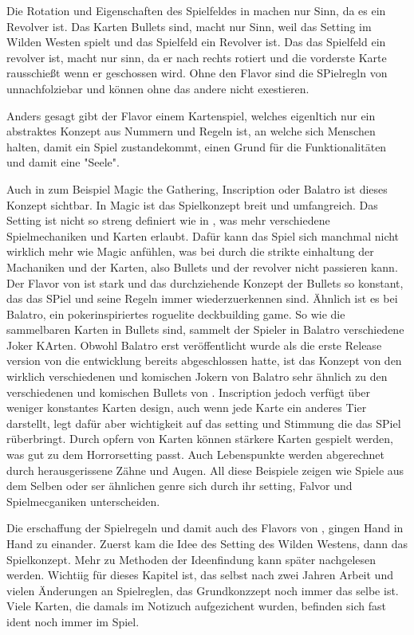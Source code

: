 Die Rotation und Eigenschaften des Spielfeldes in \FF machen nur Sinn, da es ein Revolver ist.
Das Karten Bullets sind, macht nur Sinn, weil das Setting im Wilden Westen spielt und das Spielfeld ein Revolver ist.
Das das Spielfeld ein revolver ist, macht nur sinn, da er nach rechts rotiert und die vorderste Karte rausschießt wenn er geschossen wird.
Ohne den Flavor sind die SPielregln von \FF unnachfolziebar und können ohne das andere nicht exestieren.


Anders gesagt gibt der Flavor einem Kartenspiel, welches eigenltich nur ein abstraktes Konzept aus Nummern und Regeln ist,
an welche sich Menschen halten, damit ein Spiel zustandekommt, einen Grund für die Funktionalitäten und damit eine "Seele".


Auch in zum Beispiel Magic the Gathering, Inscription oder Balatro ist dieses Konzept sichtbar. In Magic ist das Spielkonzept breit und umfangreich.
Das Setting ist nicht so streng definiert wie in \FF, was mehr verschiedene Spielmechaniken und Karten erlaubt.
Dafür kann das Spiel sich manchmal nicht wirklich mehr wie Magic anfühlen,
was bei \FF durch die strikte einhaltung der Machaniken und der Karten, also  Bullets und der revolver nicht passieren kann.
Der Flavor von \FF ist stark und das durchziehende Konzept der Bullets so konstant, das das SPiel und seine Regeln immer
wiederzuerkennen sind. Ähnlich ist es bei Balatro, ein pokerinspiriertes roguelite deckbuilding game.
So wie die sammelbaren Karten in \FF Bullets sind, sammelt der Spieler in Balatro verschiedene Joker KArten.
Obwohl Balatro erst veröffentlicht wurde als die erste Release version von \FF die entwicklung bereits abgeschlossen hatte,
ist das Konzept von den wirklich verschiedenen und komischen Jokern von Balatro sehr ähnlich zu den verschiedenen und
komischen Bullets von \FF.
Inscription jedoch verfügt über weniger konstantes Karten design, auch wenn jede Karte ein anderes Tier darstellt,
legt dafür aber wichtigkeit auf das setting und Stimmung die das SPiel rüberbringt. Durch opfern von Karten können stärkere Karten
gespielt werden, was gut zu dem Horrorsetting passt. Auch Lebenspunkte werden abgerechnet durch herausgerissene Zähne und Augen.
All diese Beispiele zeigen wie Spiele aus dem Selben oder ser ähnlichen genre sich durch ihr setting, Falvor und Spielmecganiken unterscheiden.


Die erschaffung der Spielregeln und damit auch des Flavors von \FF, gingen Hand in Hand zu einander.
Zuerst kam die Idee des Setting des Wilden Westens, dann das Spielkonzept.
Mehr zu Methoden der Ideenfindung kann später nachgelesen werden. Wichtiig für dieses Kapitel ist,
das selbst nach zwei Jahren Arbeit und vielen Änderungen an Spielreglen, das Grundkonzzept noch immer das selbe ist.
Viele Karten, die damals im Notizuch aufgezichent wurden, befinden sich fast ident noch immer im Spiel.



